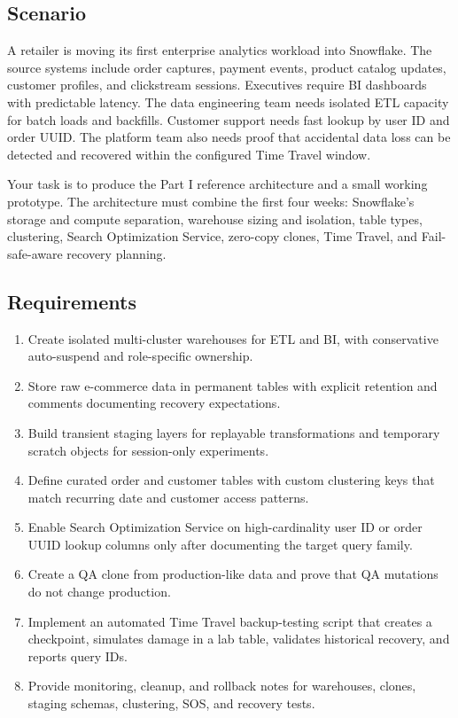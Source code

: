 \subsection*{Scenario}
A retailer is moving its first enterprise analytics workload into Snowflake. The source systems include order captures, payment events, product catalog updates, customer profiles, and clickstream sessions. Executives require BI dashboards with predictable latency. The data engineering team needs isolated ETL capacity for batch loads and backfills. Customer support needs fast lookup by user ID and order UUID. The platform team also needs proof that accidental data loss can be detected and recovered within the configured Time Travel window.

Your task is to produce the Part I reference architecture and a small working prototype. The architecture must combine the first four weeks: Snowflake's storage and compute separation, warehouse sizing and isolation, table types, clustering, Search Optimization Service, zero-copy clones, Time Travel, and Fail-safe-aware recovery planning.
\subsection*{Requirements}
\begin{enumerate}
    \item Create isolated multi-cluster warehouses for ETL and BI, with conservative auto-suspend and role-specific ownership.
    \item Store raw e-commerce data in permanent tables with explicit retention and comments documenting recovery expectations.
    \item Build transient staging layers for replayable transformations and temporary scratch objects for session-only experiments.
    \item Define curated order and customer tables with custom clustering keys that match recurring date and customer access patterns.
    \item Enable Search Optimization Service on high-cardinality user ID or order UUID lookup columns only after documenting the target query family.
    \item Create a QA clone from production-like data and prove that QA mutations do not change production.
    \item Implement an automated Time Travel backup-testing script that creates a checkpoint, simulates damage in a lab table, validates historical recovery, and reports query IDs.
    \item Provide monitoring, cleanup, and rollback notes for warehouses, clones, staging schemas, clustering, SOS, and recovery tests.
\end{enumerate}
